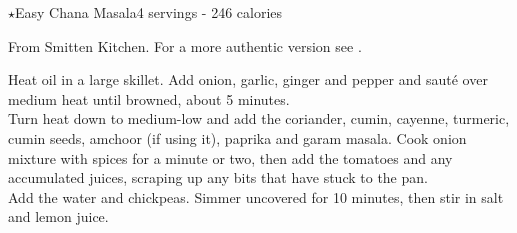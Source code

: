 \begin{recipe}{\texorpdfstring{$\star$}{str}Easy Chana Masala}{4 servings - 246 calories}{}

\freeform From Smitten Kitchen. For a more authentic version see \pageref{main:chana_masala2}.


Heat oil in a large skillet. Add onion, garlic, ginger and pepper and sauté over medium heat until browned, about 5 minutes.\\

Turn heat down to medium-low and add the coriander, cumin, cayenne, turmeric, cumin seeds, amchoor (if using it), paprika and garam masala. Cook onion mixture with spices for a minute or two, then add the tomatoes and any accumulated juices, scraping up any bits that have stuck to the pan.\\

Add the water and chickpeas. Simmer uncovered for 10 minutes, then stir in salt and lemon juice.

\end{recipe}